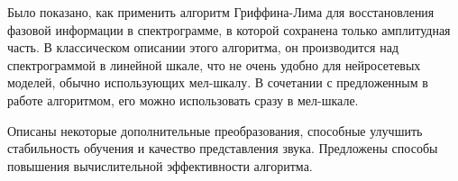 Было показано, как применить алгоритм Гриффина-Лима для восстановления фазовой информации в спектрограмме, 
в которой сохранена только амплитудная часть. В классическом описании этого алгоритма, он производится над спектрограммой в линейной шкале, 
что не очень удобно для нейросетевых моделей, обычно использующих мел-шкалу. 
В сочетании с предложенным в работе алгоритмом, его можно использовать сразу в мел-шкале.

Описаны некоторые дополнительные преобразования, способные улучшить стабильность обучения и качество представления звука. 
Предложены способы повышения вычислительной эффективности алгоритма.


